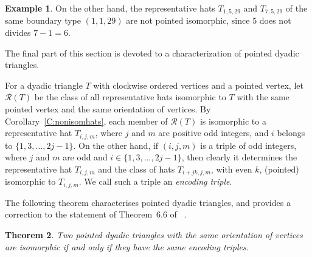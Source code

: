 \documentclass[12pt]{amsart}
\newcommand{\mcR}{\mathcal{R}}
\theoremstyle{plain}
\newtheorem{theorem}{Theorem}[section]
\theoremstyle{definition}
\newtheorem{example}[theorem]{Example}
\numberwithin{equation}{section}
\begin{document}
\begin{example}\label{Ex:nisohats}
On the other hand, the representative hats $T_{1,5,29}$ and $T_{7,5,29}$ of the same
boundary type $(1,1,29)$ are not pointed isomorphic, since $5$ does not divides $7-1 = 6$.
\end{example}


The final part of this section is devoted to a characterization of pointed dyadic triangles.


For a dyadic triangle $T$ with clockwise ordered vertices and a pointed vertex, let $\mcR(T)$ be the class of all representative hats isomorphic to $T$ with the same pointed vertex and the same orientation of vertices.
By Corollary~\ref{C:nonisomhats}, each member of $\mcR(T)$ is isomorphic to a representative hat $T_{i,j,m}$, where
$j$ and $m$ are positive odd integers, and $i$ belongs to $\{1, 3, \dots, 2j-1\}$.
On the other hand, if $(i,j,m)$ is a triple of odd integers, where $j$ and $m$ are odd and $i \in \{1, 3, \dots, 2j-1\}$, then clearly it determines the representative hat $T_{i,j,m}$ and the class of hats $T_{i+jk,j,m}$, with even $k$, (pointed) isomorphic to $T_{i,j,m}$. We call such a triple an \emph{encoding triple}.


The following theorem characterises pointed dyadic triangles, and provides a correction to the statement of Theorem~$6.6$ of ~\cite{MRS11}.


\begin{theorem}\label{T:charactdyadtrs}
Two pointed dyadic triangles with the same orientation of vertices are isomorphic if and only if they have the same encoding triples.
\end{theorem}
\end{document}
